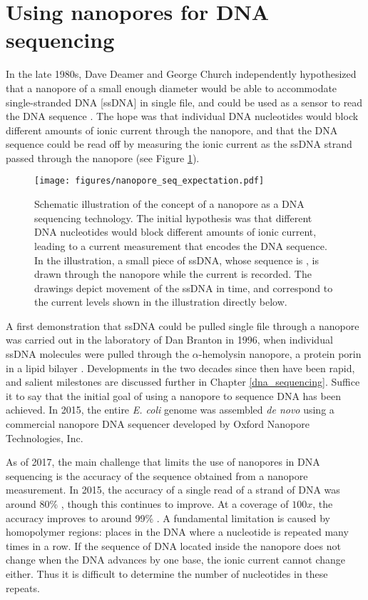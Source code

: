 \section{Using nanopores for DNA sequencing}

In the late 1980s, Dave Deamer and George Church independently hypothesized that a nanopore of a small enough diameter would be able to accommodate single-stranded DNA [ssDNA] in single file, and could be used as a sensor to read the DNA sequence \citep{Branton2008}.  The hope was that individual DNA nucleotides would block different amounts of ionic current through the nanopore, and that the DNA sequence could be read off by measuring the ionic current as the ssDNA strand passed through the nanopore (see Figure \ref{fig:nanopore_seq_expectation}).

\begin{figure}[h]
\begin{centering}
\texttt{[image: figures/nanopore\_seq\_expectation.pdf]}
\caption[Nanopore DNA sequencing concept]{Schematic illustration of the concept of a nanopore as a DNA sequencing technology.  The initial hypothesis was that different DNA nucleotides would block different amounts of ionic current, leading to a current measurement that encodes the DNA sequence.  In the illustration, a small piece of ssDNA, whose sequence is , is drawn through the nanopore while the current is recorded.  The drawings depict movement of the ssDNA in time, and correspond to the current levels shown in the illustration directly below.}
\label{fig:nanopore_seq_expectation}
\end{centering}
\end{figure}

A first demonstration that ssDNA could be pulled single file through a nanopore was carried out in the laboratory of Dan Branton in 1996, when individual ssDNA molecules were pulled through the $\alpha$-hemolysin nanopore, a protein porin in a lipid bilayer \citep{Kasianowicz1996}.  Developments in the two decades since then have been rapid, and salient milestones are discussed further in Chapter \ref{dna_sequencing}.  Suffice it to say that the initial goal of using a nanopore to sequence DNA has been achieved.  In 2015, the entire \textit{E. coli} genome was assembled \textit{de novo} using a commercial nanopore DNA sequencer\citep{Loman2015} developed by Oxford Nanopore Technologies, Inc.

As of 2017, the main challenge that limits the use of nanopores in DNA sequencing is the accuracy of the sequence obtained from a nanopore measurement.  In 2015, the accuracy of a single read of a strand of DNA was around 80\% \citep{Loman2015}, though this continues to improve.  At a coverage of $100x$, the accuracy improves to around 99\% \citep{Szalay2015}.  A fundamental limitation is caused by homopolymer regions: places in the DNA where a nucleotide is repeated many times in a row.  If the sequence of DNA located inside the nanopore does not change when the DNA advances by one base, the ionic current cannot change either.  Thus it is difficult to determine the number of nucleotides in these repeats.

